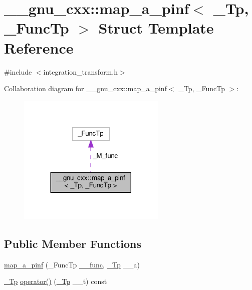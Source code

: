 \hypertarget{struct____gnu__cxx_1_1map__a__pinf}{}\section{\+\_\+\+\_\+gnu\+\_\+cxx\+:\+:map\+\_\+a\+\_\+pinf$<$ \+\_\+\+Tp, \+\_\+\+Func\+Tp $>$ Struct Template Reference}
\label{struct____gnu__cxx_1_1map__a__pinf}


{\ttfamily \#include $<$integration\+\_\+transform.\+h$>$}



Collaboration diagram for \+\_\+\+\_\+gnu\+\_\+cxx\+:\+:map\+\_\+a\+\_\+pinf$<$ \+\_\+\+Tp, \+\_\+\+Func\+Tp $>$\+:
\nopagebreak
\begin{figure}[H]
\begin{center}
\leavevmode
\includegraphics[width=200pt]{struct____gnu__cxx_1_1map__a__pinf__coll__graph}
\end{center}
\end{figure}
\subsection*{Public Member Functions}
\begin{DoxyCompactItemize}
\item 
\hyperlink{struct____gnu__cxx_1_1map__a__pinf_acc55db8d0a0fbe0bc604444dfecb2efe}{map\+\_\+a\+\_\+pinf} (\+\_\+\+Func\+Tp \hyperlink{namespace____gnu__cxx_af2b2f0c7a2ae72b922b1afefae5a65b2}{\+\_\+\+\_\+func}, \hyperlink{namespace____gnu__cxx_a3b19a9c800ca194374ef9172290f7d79}{\+\_\+\+Tp} \+\_\+\+\_\+a)
\item 
\hyperlink{namespace____gnu__cxx_a3b19a9c800ca194374ef9172290f7d79}{\+\_\+\+Tp} \hyperlink{struct____gnu__cxx_1_1map__a__pinf_afaf0f54109c7c496ce44603389bb495b}{operator()} (\hyperlink{namespace____gnu__cxx_a3b19a9c800ca194374ef9172290f7d79}{\+\_\+\+Tp} \+\_\+\+\_\+t) const
\end{DoxyCompactItemize}
